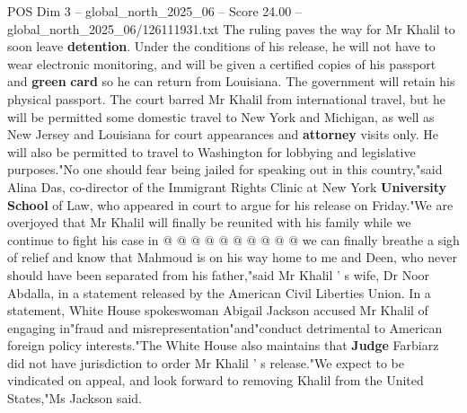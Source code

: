 \begin{textsample}{POS Dim 3 – global\_north\_2025\_06 – Score 24.00 – global\_north\_2025\_06/126111931.txt}
The ruling paves the way for Mr Khalil to soon leave \textbf{detention}.
Under the conditions of his release, he will not have to wear electronic monitoring, and will be given a certified copies of his passport and \textbf{green} \textbf{card} so he can return from Louisiana.
The government will retain his physical passport.
The court barred Mr Khalil from international travel, but he will be permitted some domestic travel to New York and Michigan, as well as New Jersey and Louisiana for court appearances and \textbf{attorney} visits only.
He will also be permitted to travel to Washington for lobbying and legislative purposes."No one should fear being jailed for speaking out in this country,"said Alina Das, co-director of the Immigrant Rights Clinic at New York \textbf{University} \textbf{School} of Law, who appeared in court to argue for his release on Friday."We are overjoyed that Mr Khalil will finally be reunited with his family while we continue to fight his case in @ @ @ @ @ @ @ @ @ @ we can finally breathe a sigh of relief and know that Mahmoud is on his way home to me and Deen, who never should have been separated from his father,"said Mr Khalil ' s wife, Dr Noor Abdalla, in a statement released by the American Civil Liberties Union.
In a statement, White House spokeswoman Abigail Jackson accused Mr Khalil of engaging in"fraud and misrepresentation"and"conduct detrimental to American foreign policy interests."The White House also maintains that \textbf{Judge} Farbiarz did not have jurisdiction to order Mr Khalil ' s release."We expect to be vindicated on appeal, and look forward to removing Khalil from the United States,"Ms Jackson said.

\end{textsample}
